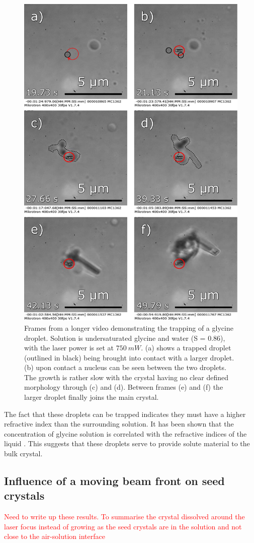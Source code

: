 \begin{figure}[h!]
	\centering
	\includegraphics[width=0.7\linewidth]{cluster_trapping.pdf}
	\caption{Frames from a longer video demonstrating the trapping of a glycine 
		droplet. Solution is undersaturated glycine and water (S = 0.86), with the 
		laser power is set at $750\ mW$. (a) shows a trapped droplet (outlined in 
		black) being brought into contact with a larger droplet. (b) upon contact 
		a nucleus can be seen between the two droplets. The growth is rather slow 
		with the crystal having no clear defined morphology through (c) and (d). 
		Between frames (e) and (f) the larger droplet finally joins the main crystal.}
	\label{fig:cluster_trapping}
\end{figure}

The fact that these droplets can be trapped indicates they must have a higher 
refractive index than the surrounding solution. It has been shown that the 
concentration of glycine solution is correlated with the refractive indices 
of the liquid \cite{Gowayed2021, Orttung1963}. This suggests that these droplets 
serve to provide solute material to the bulk crystal. 


\subsection{Influence of a moving beam front on seed crystals}
\textcolor{red}{Need to write up these results. To summarise the crystal 
	dissolved around the laser focus instead of growing as the seed crystals 
	are in the solution and not close to the air-solution interface}  


